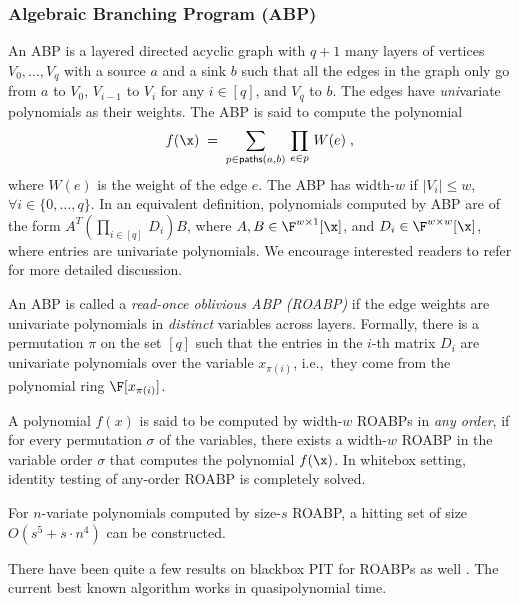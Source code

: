 \subsubsection*{Algebraic Branching Program (ABP)}
An ABP is a layered directed acyclic graph with $q+1$ many layers of vertices $V_0,\hdots,V_q$ with a source $a$ and a sink $b$ such that all the edges in the graph only go from $a$ to $V_0$, $V_{i-1}$ to $V_i$ for any $i\in [q]$, and $V_q$ to $b$. The edges have {\em uni}variate polynomials as their weights. 
The ABP is said to compute the polynomial \[ f(\x)\;=\;\sum_{p \in \mathsf{paths}(a,b)}\, \prod_{e \in p}\,W(e)\;,\]
where $W(e)$ is the weight of the edge $e$. The ABP has width-$w$ if $|V_i| \le w$, $\forall i \in \{0,\ldots,q\}$. In an equivalent definition, polynomials computed by ABP are of the form $A^T (\prod_{i \in [q]}\, D_i) B$, where $A, B \in \F^{w \times 1}[\x]$, and $D_i \in \F^{w \times w}[\x]$, where entries are univariate polynomials. We encourage interested readers to refer \cite{shpilka2010arithmetic, Mah13} for more detailed discussion.

\begin{definition}
An ABP is called a {\em read-once oblivious ABP (ROABP)} if the edge weights are univariate polynomials in \emph{distinct} variables across layers. Formally, there is a permutation $\pi$ on the set $[q]$ such that the entries in the $i$-th matrix $D_i$ are univariate polynomials over the variable $x_{\pi(i)}$, i.e.,~they come from the polynomial
ring $\F[x_{\pi(i)}]$.
\end{definition}

A polynomial $f(x)$ is said to be computed by width-$w$ ROABPs in \emph{any order}, if for every permutation $\sigma$ of the variables, there exists a width-$w$ ROABP in the variable order $\sigma$ that computes the polynomial $f(\x)$. In whitebox setting, identity testing of any-order ROABP is completely solved. 

\begin{theorem} \label{thm:white-pit-ro}
    For $n$-variate polynomials computed by size-$s$ ROABP, a hitting set of size $O(s^5 + s \cdot n^4)$ can be constructed.    
\end{theorem}

There have been quite a few results on blackbox PIT for ROABPs as well \cite{forbes2013quasipolynomial,forbes2014hitting,gurjarARO}. The current best known algorithm works in quasipolynomial time.  

